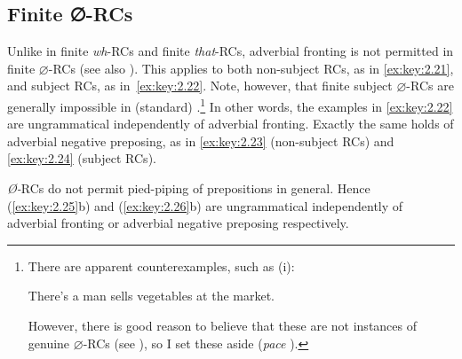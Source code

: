 \documentclass[output=paper]{langsci/langscibook}
\begin{document}
\subsection{Finite ∅-RCs}

Unlike in finite \emph{wh}{-\glspl{RC} and finite} \emph{that}{-RCs, adverbial
fronting is not permitted in finite}
$\varnothing$-\glspl{RC} (see also \citealt{Doherty1993,Doherty2000}). This applies to both
non-subject RCs, as in \eqref{ex:key:2.21}, and subject RCs, as
in~\eqref{ex:key:2.22}. Note, however, that finite subject
$\varnothing${-\glspl{RC} are} generally impossible in (standard)
.\footnote{There are apparent counterexamples, such as (i):

    \begin{exe}
          There’s a man sells vegetables at the market.
    \end{exe}

However, there is good reason to believe that these are not instances of
genuine $\varnothing$-\glspl{RC} (see
\citealt{denDikken2005,Harris1980,Henry1995,Lambrecht1988,McCawley1998}),
so I set these aside (\emph{pace} \citealt{Doherty1993,Doherty2000}).} In other
words, the examples in \eqref{ex:key:2.22} are ungrammatical independently of adverbial
fronting. Exactly the same holds of adverbial negative preposing, as in \eqref{ex:key:2.23}
(non-subject RCs) and \eqref{ex:key:2.24} (subject RCs).

\ea\label{ex:key:2.21}
    \z
\z
\ea\label{ex:key:2.22}
    \z
\z
\ea\label{ex:key:2.23}
    \z
\z
\ea\label{ex:key:2.24}
    \z
\z
\emph{Ø-}RCs do not permit pied-piping of prepositions in general. Hence (\ref{ex:key:2.25}b)
and (\ref{ex:key:2.26}b) are ungrammatical independently of adverbial fronting or adverbial
negative preposing respectively.
\end{document}
